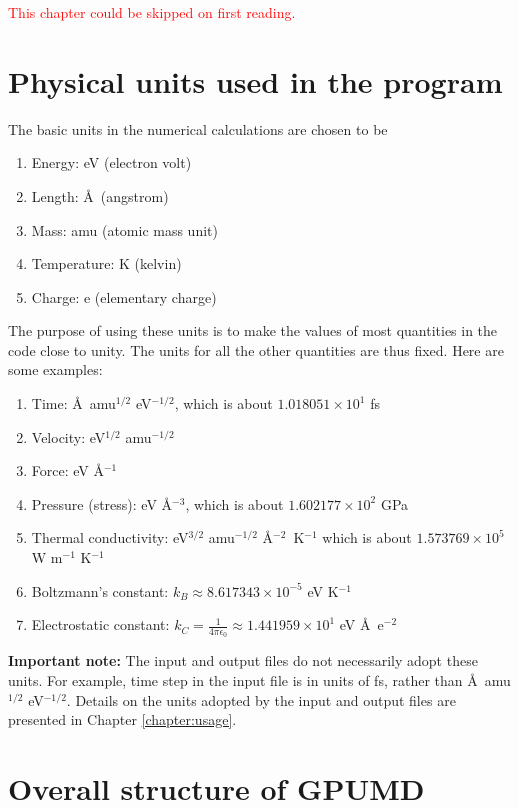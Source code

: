 \documentclass[12pt,a4paper]{report}
\begin{document}
\textcolor{red}{This chapter could be skipped on first reading.}

\section{Physical units used in the program}

The basic units in the numerical calculations are chosen to be
\begin{enumerate}
\item Energy: eV (electron volt)
\item Length: \AA~(angstrom)
\item Mass: amu (atomic mass unit)
\item Temperature: K (kelvin)
\item Charge: e (elementary charge)
\end{enumerate}
The purpose of using these units is to make the values of most quantities in the code close to unity. The units for all the other quantities are thus fixed. Here are some examples:
\begin{enumerate}
\item Time: \AA~amu$^{1/2}$ eV$^{-1/2}$, which is about $1.018051 \times 10^{1}$ fs
\item Velocity: eV$^{1/2}$ amu$^{-1/2}$
\item Force: eV \AA$^{-1}$
\item Pressure (stress): eV \AA$^{-3}$, which is about $1.602177 \times 10^{2}$ GPa
\item Thermal conductivity: eV$^{3/2}$ amu$^{-1/2}$ \AA$^{-2}$~K$^{-1}$
      which is about $1.573769 \times 10^{5}$ W m$^{-1}$ K$^{-1}$
\item Boltzmann's constant: $k_B \approx 8.617343 \times 10^{-5}$ eV K$^{-1}$
\item Electrostatic constant:
$k_C = \frac{1}{4\pi\epsilon_0} \approx 1.441959 \times 10^{1}$ eV \AA~e$^{-2}$
\end{enumerate}

\textbf{Important note:}
The input and output files do not necessarily adopt these units. For example, time step in the input file is in units of fs, rather than \AA~amu$^{1/2}$ eV$^{-1/2}$. Details on the units adopted by the input and output files are presented in Chapter \ref{chapter:usage}.


\section{Overall structure of GPUMD}
\end{document}
